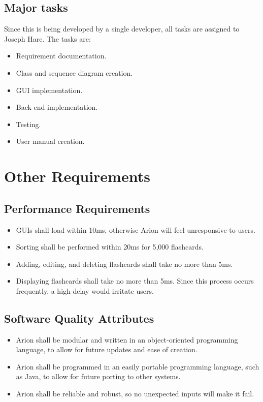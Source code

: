 \documentclass{scrreprt}
\begin{document}
\section{Major tasks}
Since this is being developed by a single developer, all tasks are assigned to Joseph Hare.
The tasks are:
\begin{itemize}
    \item Requirement documentation.
    \item Class and sequence diagram creation.
    \item GUI implementation.
    \item Back end implementation.
    \item Testing.
    \item User manual creation.
\end{itemize}


\chapter{Other Requirements}

\section{Performance Requirements}
\begin{itemize}
    \item GUIs shall load within 10ms, otherwise Arion will feel unresponsive to users.
    \item Sorting shall be performed within 20ms for 5,000 flashcards.
    \item Adding, editing, and deleting flashcards shall take no more than 5ms.
    \item Displaying flashcards shall take no more than 5ms.
        Since this process occurs frequently, a high delay would irritate users.
\end{itemize}

\section{Software Quality Attributes}
\begin{itemize}
    \item Arion shall be modular and written in an object-oriented programming language,
        to allow for future updates and ease of creation.
    \item Arion shall be programmed in an easily portable programming language,
        such as Java, to allow for future porting to other systems.
    \item Arion shall be reliable and robust, so no unexpected inputs will
        make it fail.
\end{itemize}
\end{document}

